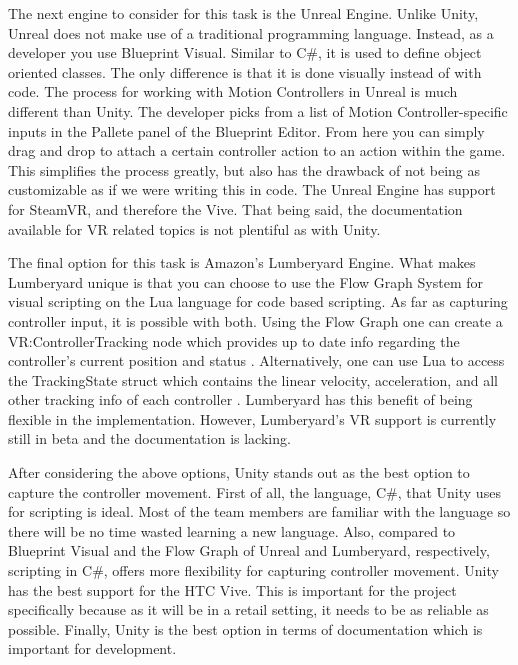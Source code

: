\documentclass[10pt,journal,compsoc,onecolumn, draftclsnofoot]{IEEEtran}
\begin{document}
\begin{bibunit}
The next engine to consider for this task is the Unreal Engine.
Unlike Unity, Unreal does not make use of a traditional programming language.
Instead, as a developer you use Blueprint Visual.
Similar to C\#, it is used to define object oriented classes.
The only difference is that it is done visually instead of with code.
The process for working with Motion Controllers in Unreal is much different than Unity.
The developer picks from a list of Motion Controller-specific inputs in the Pallete panel of the Blueprint Editor\cite{unreal_controller}.
From here you can simply drag and drop to attach a certain controller action to an action within the game.
This simplifies the process greatly, but also has the drawback of not being as customizable as if we were writing this in code.
The Unreal Engine has support for SteamVR, and therefore the Vive.
That being said, the documentation available for VR related topics is not plentiful as with Unity.

The final option for this task is Amazon's Lumberyard Engine.
What makes Lumberyard unique is that you can choose to use the Flow Graph System for visual scripting on the Lua language for code based scripting.
As far as capturing controller input, it is possible with both.
Using the Flow Graph one can create a VR:ControllerTracking node which provides up to date info regarding the controller's current position and status \cite{lumberyard_controller_flow}.
Alternatively, one can use Lua to access the TrackingState struct which contains the linear velocity, acceleration, and all other tracking info of each controller \cite{lumberyard_controller_lua}.
Lumberyard has this benefit of being flexible in the implementation.
However, Lumberyard's VR support is currently still in beta and the documentation is lacking.

After considering the above options, Unity stands out as the best option to capture the controller movement.
First of all, the language, C\#, that Unity uses for scripting is ideal.
Most of the team members are familiar with the language so there will be no time wasted learning a new language.
Also, compared to Blueprint Visual and the Flow Graph of Unreal and Lumberyard, respectively, scripting in C\#, offers more flexibility for capturing controller movement.
Unity has the best support for the HTC Vive.
This is important for the project specifically because as it will be in a retail setting, it needs to be as reliable as possible.
Finally, Unity is the best option in terms of documentation which is important for development.


\end{bibunit}
\end{document}

